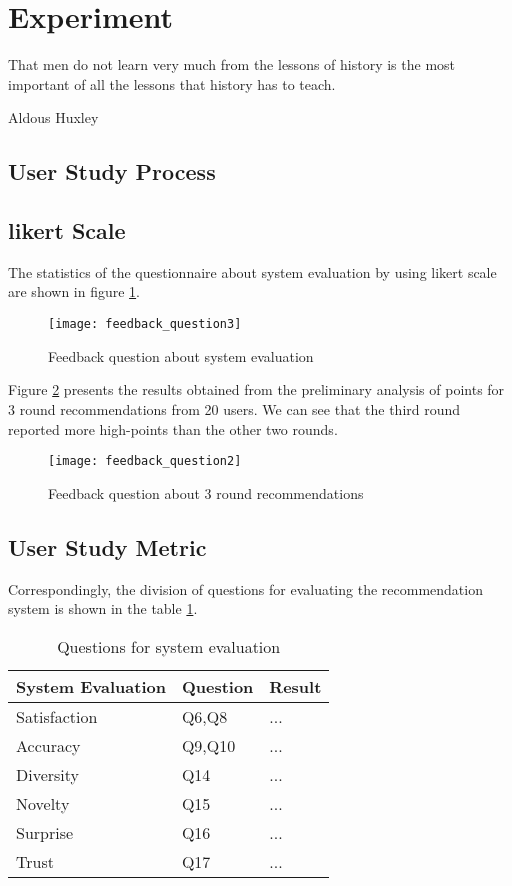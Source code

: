 
\section{Experiment}
\label{ch:experiment}

\epigraph{That men do not learn very much from the lessons of history is the most important of all the lessons that history has to teach.}{Aldous Huxley}

\subsection{User Study Process}

\subsection{likert Scale}
The statistics of the questionnaire about system evaluation by using likert scale are shown in figure \ref{figure:1}.

\begin{figure}[h]
\caption{Feedback question about system evaluation}
\label{figure:1}
\centering
\texttt{[image: feedback\_question3]}
\end{figure}

Figure \ref{figure:2} presents the results obtained from the preliminary analysis of points for 3 round recommendations from 20 users. We can see that the third round reported more high-points than the other two rounds.

\begin{figure}[h]
\caption{Feedback question about 3 round recommendations}
\label{figure:2}
\centering
\texttt{[image: feedback\_question2]}
\end{figure}



\subsection{User Study Metric}
Correspondingly, the division of questions for evaluating the recommendation system is shown in the table \ref{table:1}.

\begin{table}[h!]
\renewcommand\arraystretch{1.5}
\centering
\begin{tabular}{p{80pt}p{60pt}p{120pt}}\toprule
 \hline
 System Evaluation & Question & Result \\ [0.5ex] 
 \hline
  Satisfaction & Q6,Q8 & ...  \\
  Accuracy  & Q9,Q10 & ... \\ 
  Diversity & Q14 & ... \\
  Novelty & Q15 & ... \\
  Surprise & Q16 & ... \\
  Trust & Q17 & ... \\
  [1ex] 
 \hline
\end{tabular}
\caption{Questions for system evaluation}
\label{table:1}
\end{table}

